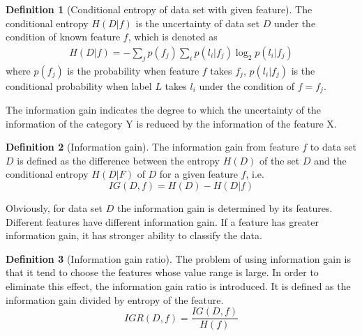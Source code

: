 \documentclass{ieeeaccess}
\theoremstyle{definition}
\newtheorem{defn}{Definition}
\begin{document}
\begin{defn}[Conditional entropy of data set with given feature]
The conditional entropy $H(D|f)$ is the uncertainty of data set $D$ under the condition of known feature $f$, which is denoted as
\begin{align}
    H(D|f)=-\sum_{j} p(f_j) \sum_{i} p(l_i|f_j) \log_2 p(l_i|f_j)
\end{align}
where $p(f_j)$ is the probability when feature $f$ takes $f_j$, $p(l_i|f_j)$ is the conditional probability when label $L$ takes $l_i$ under the condition of $f=f_j$.
\end{defn}

The information gain indicates the degree to which the uncertainty of the information of the category Y is reduced by the information of the feature X.

\begin{defn}[Information gain]
    The information gain from feature $f$ to data set $D$ is defined as the difference between the entropy $H(D)$ of the set $D$ and the conditional entropy $H(D|F)$ of $D$ for a given feature $f$, i.e.
\begin{equation}
    IG(D, f) = H(D) - H(D|f)
\end{equation}
\end{defn}

Obviously, for data set $D$ the information gain is determined by its features. Different features have different information gain. If a feature has greater information gain, it has stronger ability to classify the data.

\begin{defn}[Information gain ratio]
The problem of using information gain is that it tend to choose the features whose value range is large. In order to eliminate this effect, the information gain ratio is introduced. It is defined as the information gain divided by entropy of the feature.
\begin{equation}
    IGR(D, f) = \frac{IG(D, f)}{H(f)}
\end{equation}
\end{defn}
\end{document}
